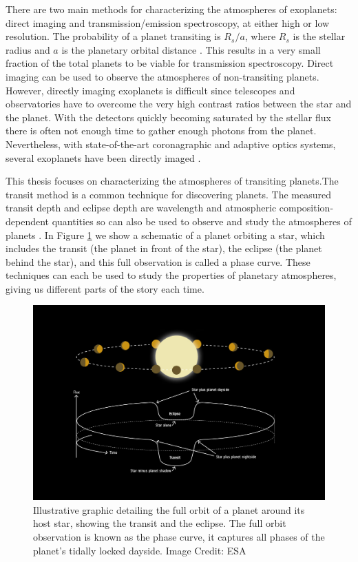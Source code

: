 There are two main methods for characterizing the atmospheres of exoplanets: direct imaging and transmission/emission spectroscopy, at either high or low resolution. The probability of a planet transiting is $R_s/a$, where $R_s$ is the stellar radius and $a$ is the planetary orbital distance \citep{Borucki1984}. This results in a very small fraction of the total planets to be viable for transmission spectroscopy. Direct imaging can be used to observe the atmospheres of non-transiting planets. However, directly imaging exoplanets is difficult since telescopes and observatories have to overcome the very high contrast ratios between the star and the planet. With the detectors quickly becoming saturated by the stellar flux there is often not enough time to gather enough photons from the planet. Nevertheless, with state-of-the-art coronagraphic and adaptive optics systems, several exoplanets have been directly imaged \citep[e.g.,][]{Marois2008,Marois2010,Lagrange2010,Rameau2013,Kuzuhara2013}.

This thesis focuses on characterizing the atmospheres of transiting planets.The transit method is a common technique for discovering planets. The measured transit depth and eclipse depth are wavelength and atmospheric composition-dependent quantities so can also be used to observe and study the atmospheres of planets \citep[e.g.,][]{Seager2000a, Brown2001, Charbonneau2005, Deming2005a}. In Figure \ref{int:fig:phasecurve} we show a schematic of a planet orbiting a star, which includes the transit (the planet in front of the star), the eclipse (the planet behind the star), and this full observation is called a phase curve. These techniques can each be used to study the properties of planetary atmospheres, giving us different parts of the story each time.

\begin{figure}
    \centering
    \includegraphics[width = \linewidth]{Exoplanet_phase_curve.jpg}
    \caption{Illustrative graphic detailing the full orbit of a planet around its host star, showing the transit and the eclipse. The full orbit observation is known as the phase curve, it captures all phases of the planet's tidally locked dayside. Image Credit: ESA}
    \label{int:fig:phasecurve}
\end{figure}

